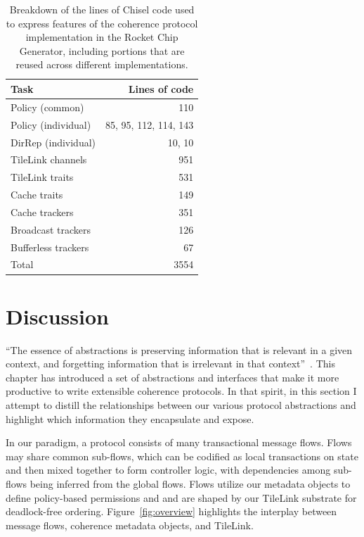 \begin{table}[t] 
\begin{center}
\begin{tabular}{|l|r|} 
\hline
Task & Lines of code \\ \hline \hline
Policy (common) & 110 \\ \hline
Policy (individual) & 85, 95, 112, 114, 143 \\ \hline
DirRep (individual) & 10, 10 \\ \hline \hline
TileLink channels & 951 \\ \hline \hline
TileLink traits & 531 \\ \hline
Cache traits & 149 \\ \hline \hline
Cache trackers & 351 \\ \hline
Broadcast trackers & 126 \\ \hline
Bufferless trackers & 67 \\ \hline \hline
Total & 3554\\ \hline
\end{tabular}
\caption[Breakdown of the reuse in Chisel source code.]{Breakdown of the lines of Chisel code used to express features of the
coherence protocol implementation in the Rocket Chip Generator,
including portions that are reused across different implementations.}
\label{tab:loc}
\end{center}
\end{table}



\section{Discussion}

``The essence of abstractions is preserving information that is relevant in a given context, and forgetting information that is irrelevant in that context''~\cite{guttag2014introduction}.
This chapter has introduced a set of abstractions and interfaces that make it more productive to write extensible coherence protocols.
In that spirit, in this section I attempt to distill the relationships between our various protocol abstractions and highlight which information they encapsulate and expose.

In our paradigm, a protocol consists of many transactional message flows.
Flows may share common sub-flows, which can be codified as local transactions on state
and then mixed together to form controller logic,
with dependencies among sub-flows being inferred from the global flows.
Flows utilize our metadata objects to define policy-based permissions
and and are shaped by our TileLink substrate for deadlock-free ordering.
Figure~\ref{fig:overview} highlights the interplay between message flows, coherence metadata objects, and TileLink.

